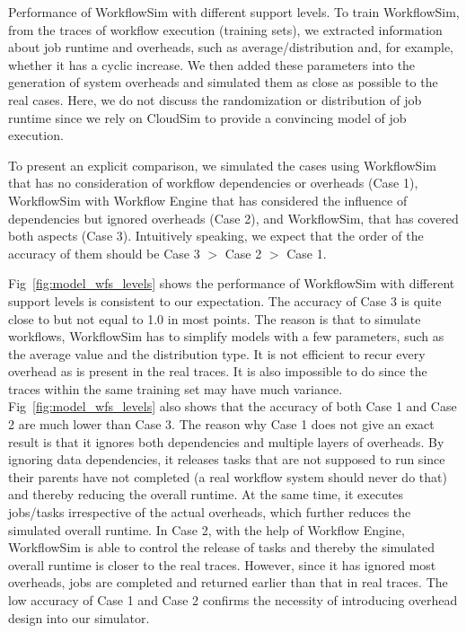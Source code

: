 Performance of WorkflowSim with different support levels. 
To train WorkflowSim, from the traces of workflow execution (training sets), we extracted information about job runtime and overheads, such as average/distribution and, for example, whether it has a cyclic increase. We then added these parameters into the generation of system overheads and simulated them as close as possible to the real cases. Here, we do not discuss the randomization or distribution of job runtime since we rely on CloudSim to provide a convincing model of job execution.

To present an explicit comparison, we simulated the cases using WorkflowSim that has no consideration of workflow dependencies or overheads (Case 1), WorkflowSim with Workflow Engine that has considered the influence of dependencies but ignored overheads (Case 2), and WorkflowSim, that has covered both aspects (Case 3). Intuitively speaking, we expect that the order of the accuracy of them should be Case 3 $>$ Case 2 $>$ Case 1. 

Fig~\ref{fig:model_wfs_levels} shows the performance of WorkflowSim with different support levels is consistent to our expectation. The accuracy of Case 3 is quite close to but not equal to 1.0 in most points. The reason is that to simulate workflows, WorkflowSim has to simplify models with a few parameters, such as the average value and the distribution type. It is not efficient to recur every overhead as is present in the real traces. It is also impossible to do since the traces within the same training set may have much variance. Fig~\ref{fig:model_wfs_levels} also shows that the accuracy of both Case 1 and Case 2 are much lower than Case 3. The reason why Case 1 does not give an exact result is that it ignores both dependencies and multiple layers of overheads. By ignoring data dependencies, it releases tasks that are not supposed to run since their parents have not completed (a real workflow system should never do that) and thereby reducing the overall runtime. At the same time, it executes jobs/tasks irrespective of the actual overheads, which further reduces the simulated overall runtime. In Case 2, with the help of Workflow Engine, WorkflowSim is able to control the release of tasks and thereby the simulated overall runtime is closer to the real traces. However, since it has ignored most overheads, jobs are completed and returned earlier than that in real traces. The low accuracy of Case 1 and Case 2 confirms the necessity of introducing overhead design into our simulator. 


